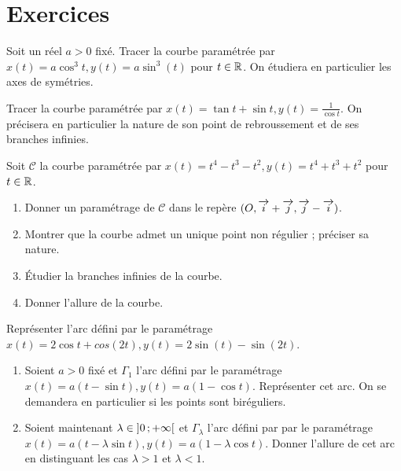 \section{Exercices}
\begin{exercice}[Astroïde]
    Soit un réel \(a > 0\) fixé. Tracer la courbe paramétrée par \(x(t) = a \cos^3 t, y(t) = a \sin^3(t)\) pour \(t \in \mathbb{R}\). On étudiera en particulier les axes de symétries.
\end{exercice}
\begin{exercice}
    Tracer la courbe paramétrée par \(x(t) = \tan t + \sin t, y(t) = \frac{1}{\cos t}\). On précisera en particulier la nature de son point de rebroussement et de ses branches infinies.
\end{exercice}
\begin{exercice}
    Soit \(\mathcal{C}\) la courbe paramétrée par \(x(t) = t^4 - t^3 - t^2, y(t) = t^4 + t^3 + t^2\) pour \(t \in \mathbb{R}\).
    \begin{enumerate}
        \item Donner un paramétrage de \(\mathcal{C}\) dans le repère \((O, \overrightarrow{i}+\overrightarrow{j},\overrightarrow{j}-\overrightarrow{i})\).
        \item Montrer que la courbe admet un unique point non régulier ; préciser sa nature.
        \item Étudier la branches infinies de la courbe.
        \item Donner l'allure de la courbe.
    \end{enumerate}
\end{exercice}
\begin{exercice}[Deltoïde]
    Représenter l'arc défini par le paramétrage \(x(t) = 2 \cos t + cos(2t), y(t) = 2\sin(t) - \sin(2t)\).
\end{exercice}
\begin{exercice}[Cycloïde]
    \begin{enumerate}
        \item Soient \(a>0\) fixé et \(\Gamma_1\) l'arc défini par le paramétrage \(x(t) = a(t-\sin t), y(t) = a(1-\cos t)\). Représenter cet arc. On se demandera en particulier si les points sont biréguliers.
        \item Soient maintenant \(\lambda \in \left] 0 \, ;  +\infty \right[\) et \(\Gamma_\lambda\) l'arc défini par par le paramétrage \(x(t) = a(t-\lambda \sin t), y(t) = a(1-\lambda \cos t)\). Donner l'allure de cet arc en distinguant les cas \(\lambda >1\) et \(\lambda < 1\).
    \end{enumerate}
\end{exercice}

